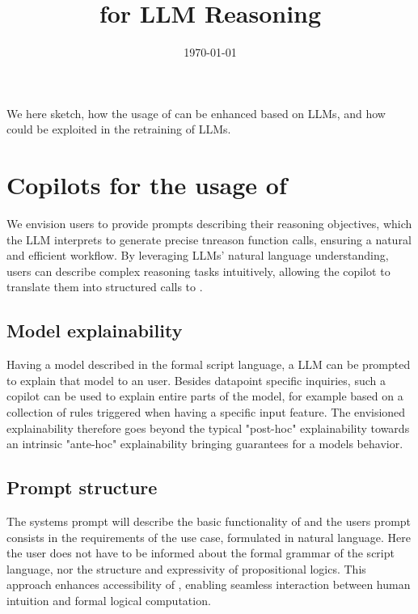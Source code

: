 \documentclass[aps,onecolumn,nofootinbib,pra]{article}
\begin{document}
\title{\tnreason{} for LLM Reasoning}

\maketitle
\date{\today}

We here sketch, how the usage of \tnreason{} can be enhanced based on LLMs, and how \tnreason{} could be exploited in the retraining of LLMs.

\section{Copilots for the usage of \tnreason{}}

We envision users to provide prompts describing their reasoning objectives, which the LLM interprets to generate precise tnreason function calls, ensuring a natural and efficient workflow.
By leveraging LLMs' natural language understanding, users can describe complex reasoning tasks intuitively, allowing the copilot to translate them into structured calls to \tnreason{}.

\subsection{Model explainability}

Having a \tnreason{} model described in the formal script language, a LLM can be prompted to explain that model to an user.
Besides datapoint specific inquiries, such a copilot can be used to explain entire parts of the model, for example based on a collection of rules triggered when having a specific input feature.
The envisioned explainability therefore goes beyond the typical "post-hoc" explainability towards an intrinsic "ante-hoc" explainability bringing guarantees for a models behavior.

\subsection{Prompt structure}

The systems prompt will describe the basic functionality of \tnreason{} and the users prompt consists in the requirements of the use case, formulated in natural language.
Here the user does not have to be informed about the formal grammar of the \tnreason{} script language, nor the structure and expressivity of propositional logics.
This approach enhances accessibility of \tnreason{}, enabling seamless interaction between human intuition and formal logical computation.
\end{document}
